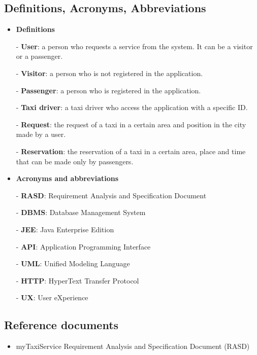 	\subsection{Definitions, Acronyms, Abbreviations}
		\begin{itemize}
			\item \textbf{Definitions}
				\item[-] \textbf{User}: a person who requests a service from the system. It can be a visitor or a passenger.
				\item[-] \textbf{Visitor}: a person who is not registered in the application.
				\item[-] \textbf{Passenger}: a person who is registered in the application.
				\item[-] \textbf{Taxi driver}: a taxi driver who access the application with a specific ID.
				\item[-] \textbf{Request}: the request of a taxi in a certain area and position in the city made by a user.
				\item[-] \textbf{Reservation}: the reservation of a taxi in a certain area, place and time that can be made only by passengers.

			\item \textbf{Acronyms and abbreviations}
				\item[-] \textbf{RASD}: Requirement Analysis and Specification Document
				\item[-] \textbf{DBMS}: Database Management System
				\item[-] \textbf{JEE}: Java Enterprise Edition
				\item[-] \textbf{API}: Application Programming Interface
				\item[-] \textbf{UML}: Unified Modeling Language
				\item[-] \textbf{HTTP}: HyperText Transfer Protocol
				\item[-] \textbf{UX}: User eXperience
			
		\end{itemize}
	\subsection{Reference documents}
		\begin{itemize}
			\item myTaxiService Requirement Analysis and Specification Document (RASD)
	\newpage		
		\end{itemize}
